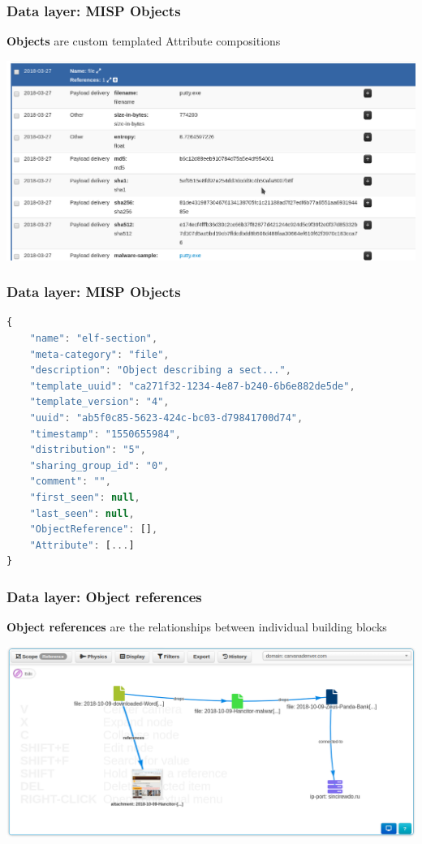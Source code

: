 \begin{frame}
    \frametitle{Data layer: MISP Objects}
        {\bf Objects} are custom templated Attribute compositions
        \begin{center}
            \includegraphics[width=1.0\linewidth]{object.png}
        \end{center}
\end{frame}

\begin{frame}[fragile]
    \frametitle{Data layer: MISP Objects}
        \begin{lstlisting}[language=javascript,firstnumber=1]
{
    "name": "elf-section",
    "meta-category": "file",
    "description": "Object describing a sect...",
    "template_uuid": "ca271f32-1234-4e87-b240-6b6e882de5de",
    "template_version": "4",
    "uuid": "ab5f0c85-5623-424c-bc03-d79841700d74",
    "timestamp": "1550655984",
    "distribution": "5",
    "sharing_group_id": "0",
    "comment": "",
    "first_seen": null,
    "last_seen": null,
    "ObjectReference": [],
    "Attribute": [...]
}
\end{lstlisting}
\end{frame}

\begin{frame}[fragile]
    \frametitle{Data layer: Object references}
    {\bf Object references} are the relationships between individual building blocks
    \begin{center}
        \includegraphics[width=1.0\linewidth]{screenshots/eventgraph.png}
    \end{center}
\end{frame}

